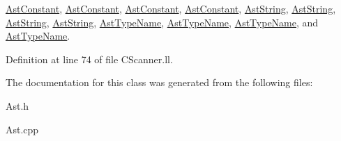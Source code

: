 \hyperlink{classAstConstant_ac13b7246f9d646a5ff00efee4c39bc6b}{Ast\-Constant}, \hyperlink{classAstConstant_ac13b7246f9d646a5ff00efee4c39bc6b}{Ast\-Constant}, \hyperlink{classAstConstant_ac13b7246f9d646a5ff00efee4c39bc6b}{Ast\-Constant}, \hyperlink{classAstConstant_ac13b7246f9d646a5ff00efee4c39bc6b}{Ast\-Constant}, \hyperlink{classAstString_a0a7a6576cf72bfbcd2f78c7ffb9350bb}{Ast\-String}, \hyperlink{classAstString_a0a7a6576cf72bfbcd2f78c7ffb9350bb}{Ast\-String}, \hyperlink{classAstString_a0a7a6576cf72bfbcd2f78c7ffb9350bb}{Ast\-String}, \hyperlink{classAstString_a0a7a6576cf72bfbcd2f78c7ffb9350bb}{Ast\-String}, \hyperlink{classAstTypeName_adcd2b22b4135cadd7b9117e25a5dff45}{Ast\-Type\-Name}, \hyperlink{classAstTypeName_adcd2b22b4135cadd7b9117e25a5dff45}{Ast\-Type\-Name}, \hyperlink{classAstTypeName_adcd2b22b4135cadd7b9117e25a5dff45}{Ast\-Type\-Name}, and \hyperlink{classAstTypeName_adcd2b22b4135cadd7b9117e25a5dff45}{Ast\-Type\-Name}.



Definition at line 74 of file C\-Scanner.\-ll.



The documentation for this class was generated from the following files\-:\begin{DoxyCompactItemize}
\item 
Ast.\-h\item 
Ast.\-cpp\end{DoxyCompactItemize}
